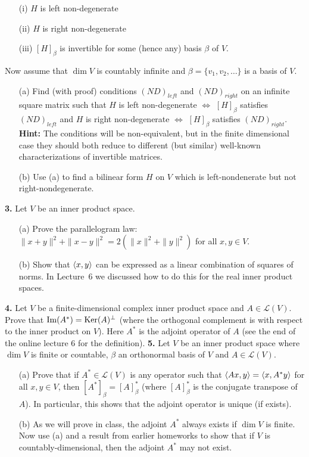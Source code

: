 \documentclass[12pt]{amsart}
\begin{document}
\begin{itemize}
\item[(i)] $H$ is left non-degenerate
\item[(ii)] $H$ is right non-degenerate
\item[(iii)] $[H]_{\beta}$ is invertible for some (hence any) basis $\beta$ of $V$.
\end{itemize}

Now assume that $\dim V$ is countably infinite and $\beta=\{v_1,v_2,\ldots\}$ is a basis of $V$. 

\begin{itemize}
\item[(a)] Find (with proof) conditions $(ND)_{left}$ and $(ND)_{right}$ on an infinite square matrix such that $H$ is left non-degenerate $\iff$ $[H]_{\beta}$ satisfies $(ND)_{left}$
and $H$ is right non-degenerate $\iff$ $[H]_{\beta}$ satisfies $(ND)_{right}$. {\bf Hint:} The conditions will be non-equivalent, but in the finite dimensional case they should both reduce to different (but similar) well-known characterizations of invertible matrices.

\item[(b)] Use (a) to find a bilinear form $H$ on $V$ which is left-nondenerate but not right-nondegenerate.
\end{itemize}






 


\skv
{\bf 3.} Let $V$ be an inner product space.
\begin{itemize}
\item[(a)] Prove the parallelogram law: $\|x+y\|^2+\|x-y\|^2=2(\|x\|^2+\|y\|^2)$ for all $x,y\in V$.
\item[(b)] Show that ${\langle} x,y{\rangle}$ can be expressed as a linear combination of squares of norms. In Lecture~6 we discussed how to do this for the real
inner product spaces. 
\end{itemize}
\skv
{\bf 4.} Let $V$ be a finite-dimensional complex inner product space and $A\in\mathcal L(V)$.
Prove that ${\rm Im}(A^*)={\rm Ker}(A)^{\perp}$ (where the orthogonal complement is with respect to the inner product on $V$).
Here $A^*$ is the adjoint operator of $A$ (see the end of the online lecture 6 for the definition).
\skv
{\bf 5.} Let $V$ be an inner product space where $\dim V$ is finite or countable, $\beta$ an orthonormal basis of $V$ and $A\in\mathcal L(V)$. 
\begin{itemize} 
\item[(a)] Prove that if $A^*\in \mathcal L(V)$ is any operator such that ${\langle} Ax,y{\rangle}={\langle} x,A^*y{\rangle}$ for all $x,y\in V$, then $[A^*]_{\beta}=[A]_{\beta}^*$ (where $[A]_{\beta}^*$ is the conjugate transpose of $A$).
In particular, this shows that the adjoint operator is unique (if exists).
\item[(b)] As we will prove in class, the adjoint $A^*$ always exists if $\dim V$ is finite. Now use (a) and a result from earlier homeworks to
show that if $V$ is countably-dimensional, then the adjoint $A^*$ may not exist.
\end{itemize}
\end{document}
